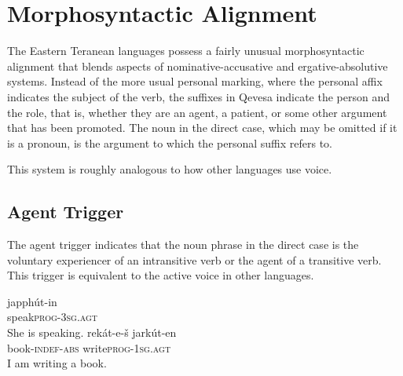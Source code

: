 \documentclass[grammar]{subfiles}
\begin{document}
\section{Morphosyntactic Alignment}
\label{sec:vp_trigger_system}


The Eastern Teranean languages possess a fairly unusual morphosyntactic
alignment that blends aspects of nominative-accusative and ergative-absolutive
systems.  Instead of the more usual personal marking, where the personal affix
indicates the subject of the verb, the suffixes in Qevesa indicate the person
and the role, that is, whether they are an agent, a patient, or some other
argument that has been promoted.  The noun in the direct case, which may be
omitted if it is a pronoun, is the argument to which the personal suffix
refers to. 


This system is roughly analogous to how other languages use voice.


\subsection{Agent Trigger}
\label{ssec:vp_agt_trigger}

The agent trigger indicates that the noun phrase in the direct case is the
voluntary experiencer of an intransitive verb or the agent of a transitive
verb.  This trigger is equivalent to the active voice in other languages.

\begin{exe}
  \ex {}
  \gll japphút-in\\
  speak\textsc{\bs prog-3sg.agt}\\
  \glt She is speaking.
  \ex {}
  \gll rekát-e-š jarkút-en\\
  book\textsc{-indef-abs} write\textsc{\bs prog-1sg.agt}\\
  \glt I am writing a book.
\end{exe}

\end{document}
